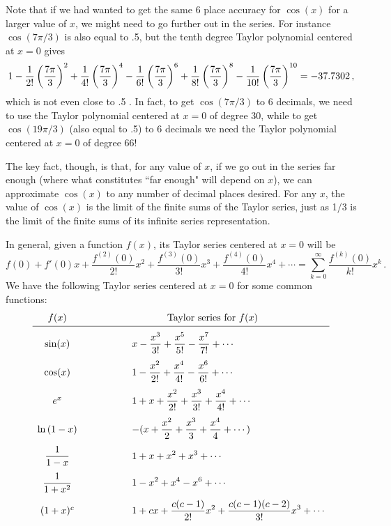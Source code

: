 {{{{Note that if we had wanted to get the same 6 place accuracy for $\cos(x)$ for a larger value of $x$, we might need to go further out in the series.  For instance $\cos(7\pi/3)$ is also equal to .5, but the tenth degree Taylor polynomial centered at $x=0$ gives
\small
\[
1 - {1 \over 2!} \left( {7\pi \over 3} \right)^2 
                + {1 \over 4!} \left( {7\pi \over 3} \right)^4
                - {1 \over 6!} \left( {7\pi \over 3} \right)^6
                + {1 \over 8!} \left( {7\pi \over 3} \right)^8
                - {1 \over 10!} \left( {7\pi \over 3} \right)^{10}
                = -37.7302  \, ,
\]
\normalsize
which is not even close to .5 .  In fact, to get $\cos(7\pi/3)$ to 6 decimals, we need to use the Taylor polynomial centered at $x=0$ of degree 30, while to get $\cos(19\pi/3)$ (also equal to .5) to 6 decimals  we need the Taylor polynomial centered at $x=0$ of degree 66!  

The key fact, though, is that, for any value of $x$, if we go out in the series far enough (where what constitutes ``far enough" will depend on $x$), we can approximate $\cos(x)$ to any number of decimal places desired. For any $x$, the value of $\cos(x)$ is the limit of the finite sums of the Taylor series, just as 1/3 is the limit of the finite sums of its infinite series representation.

In general, given a function $f(x)$, its Taylor series centered at $x=0$ will be
 \[
f(0)+f'(0)x+\frac{f^{(2)}(0)}{2!}x^2+\frac{f^{(3)}(0)}{3!}x^3+\frac{f^{(4)}(0)}{4!}x^4+\cdots = \sum_{k=0}^{\infty} \frac{f^{(k)}(0)}{k!}x^k\, .
\]
We have the following Taylor series centered at $x=0$ for some common functions:
\[
\begin{array}{ccl}
        f(x) &\hspace{.5in} & \hspace{.5in}\mbox{Taylor series for $f(x)$} \\ [2pt] \hline
        & & \\ [-6pt] 
        \sin(x) & &{\displaystyle x - {x^3 \over 3!} + {x^5 \over 5!} 
                - {x^7 \over 7!} + \cdots }\\ [.15in]
        \cos(x) & &{\displaystyle 1 - {x^2 \over 2!} + {x^4 \over 4!} 
                - {x^6 \over 6!} + \cdots }\\ [.15in]
        e^x & &{\displaystyle 1 + x + {x^2 \over 2!} + {x^3 \over 3!} 
                + {x^4 \over 4!} + \cdots  } \\ [.15in]
        \ln{(1-x)}& &{\displaystyle  -(x+{x^2 \over 2} + {x^3 \over 3} 
                + {x^4 \over 4} + \cdots)}\\ [.15in]
        {\displaystyle {1 \over {1-x}} }& &{\displaystyle 1+x+x^2+x^3+\cdots } \\ [.15in]
        {\displaystyle {1 \over {1+x^2}} }& &{\displaystyle 1-x^2+x^4-x^6+\cdots} \\ [.15in]
        (1+x)^c & &{\displaystyle 1 +cx+{c(c-1) \over 2!}x^2+{c(c-1)(c-2) \over 3!}x^3 + \cdots}
        \end{array}
\]

}}}}
